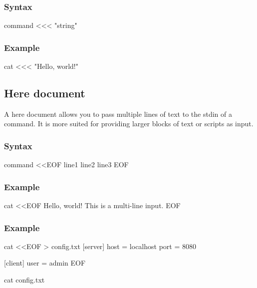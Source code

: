 \documentclass{report}
\begin{document}
    \bigbreak \noindent 
    \subsubsection{Syntax}
    \bigbreak \noindent 
    \begin{bashcode}
    command <<< "string"
    \end{bashcode}
    \bigbreak \noindent 
    \subsubsection{Example}
    \bigbreak \noindent 
    \begin{bashcode}
    cat <<< "Hello, world!"
    \end{bashcode}

    \bigbreak \noindent 
    \subsection{Here document}
    \bigbreak \noindent 
    A here document allows you to pass multiple lines of text to the stdin of a command. It is more suited for providing larger blocks of text or scripts as input.
    \bigbreak \noindent 
    \subsubsection{Syntax}
    \bigbreak \noindent 
    \begin{bashcode}
    command <<EOF
    line1
    line2
    line3
    EOF
    \end{bashcode}
    \bigbreak \noindent 
    \subsubsection{Example}
    \bigbreak \noindent 
    \begin{bashcode}
    cat <<EOF
    Hello,
    world!
    This is a multi-line input.
    EOF
    \end{bashcode}
    \bigbreak \noindent 
    \subsubsection{Example}
    \bigbreak \noindent 
    \begin{bashcode}
    cat <<EOF > config.txt
    [server]
    host = localhost
    port = 8080

    [client]
    user = admin
    EOF

    cat config.txt
    \end{bashcode}
\end{document}
